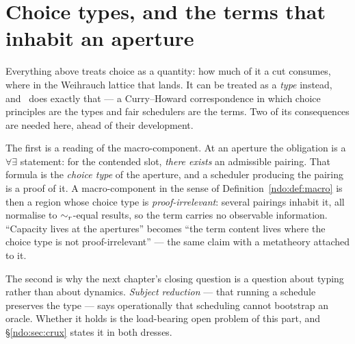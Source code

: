 \section{Choice types, and the terms that inhabit an aperture}\label{ndo:sec:types}

Everything above treats choice as a quantity: how much of it a cut consumes, where in
the Weihrauch lattice that lands. It can be treated as a \emph{type} instead, and
\chChs\ does exactly that --- a Curry--Howard correspondence in which choice principles
are the types and fair schedulers are the terms. Two of its consequences are needed
here, ahead of their development.

The first is a reading of the macro-component. At an aperture the obligation is a
$\forall\exists$ statement: for the contended slot, \emph{there exists} an admissible
pairing. That formula is the \emph{choice type} of the aperture, and a scheduler
producing the pairing is a proof of it. A macro-component in the sense of
Definition~\ref{ndo:def:macro} is then a region whose choice type is
\emph{proof-irrelevant}: several pairings inhabit it, all normalise to $\sim_{r}$-equal
results, so the term carries no observable information. ``Capacity lives at the
apertures'' becomes ``the term content lives where the choice type is not
proof-irrelevant'' --- the same claim with a metatheory attached to it.

The second is why the next chapter's closing question is a question about typing rather
than about dynamics. \emph{Subject reduction} --- that running a schedule preserves the
type --- says operationally that scheduling cannot bootstrap an oracle. Whether it holds
is the load-bearing open problem of this part, and \S\ref{ndo:sec:crux} states it in
both dresses.
